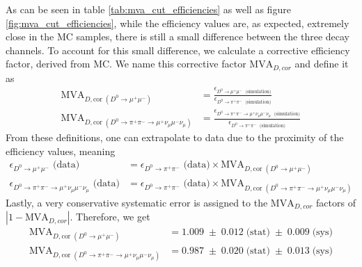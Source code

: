 As can be seen in table \ref{tab:mva_cut_efficiencies} as well as figure \ref{fig:mva_cut_efficiencies}, while the efficiency values are, as expected, extremely close in the MC samples, there is still a small difference between the three decay channels. To account for this small difference, we calculate a corrective efficiency factor, derived from MC. We name this corrective factor $\text{MVA}_{D, cor}$ and define it as
\begin{equation}
    \begin{split}
    \text{MVA}_{D,\text{cor}\;(D^0 \to \mu^+ \mu^-)} &= 
    \frac{\epsilon_{D^0 \to \mu^+ \mu^-\; \text{ (simulation)}}}
         {\epsilon_{D^0 \to \pi^+ \pi^-\; \text{ (simulation)}}} \\
    \text{MVA}_{D,\text{cor}\;(D^0 \to \pi^+ \pi^- \to \mu^+ \nu_\mu \mu^- \nu_\mu)} &= 
    \frac{\epsilon_{D^0 \to \pi^+ \pi^- \to \mu^+ \nu_\mu \mu^- \nu_\mu\; \text{ (simulation)}}}
         {\epsilon_{D^0 \to \pi^+ \pi^-\; \text{ (simulation)}}}
    \end{split}
\end{equation}
From these definitions, one can extrapolate to data due to the proximity of the efficiency values, meaning
\begin{equation}
    \begin{split}
    \epsilon_{D^0 \to \mu^+ \mu^-} \text{ (data)} &= 
    \epsilon_{D^0 \to \pi^+ \pi^-} \text{ (data)} 
    \times \text{MVA}_{D,\text{cor}\;(D^0 \to \mu^+ \mu^-)} \\
    \epsilon_{D^0 \to \pi^+ \pi^- \to \mu^+ \nu_\mu \mu^- \nu_\mu} \text{ (data)} &= 
    \epsilon_{D^0 \to \pi^+ \pi^-} \text{ (data)} 
    \times \text{MVA}_{D,\text{cor}\;(D^0 \to \pi^+ \pi^- \to \mu^+ \nu_\mu \mu^- \nu_\mu)}
    \end{split}
\end{equation}
Lastly, a very conservative systematic error is assigned to the $\text{MVA}_{D, cor}$ factors of $|1-\text{MVA}_{D, cor}|$. Therefore, we get
\begin{equation}
\begin{split}
    \text{MVA}_{D,\text{cor}\;(D^0 \to \mu^+ \mu^-)} &= 1.009\;\pm\;0.012 \; \text{(stat)}\;\pm\;0.009 \; \text{(sys)} \\
    \text{MVA}_{D,\text{cor}\;(D^0 \to \pi^+ \pi^- \to \mu^+ \nu_\mu \mu^- \nu_\mu)} &= 0.987\;\pm\;0.020 \; \text{(stat)}\;\pm\;0.013 \; \text{(sys)}
\end{split}
\end{equation}
    
